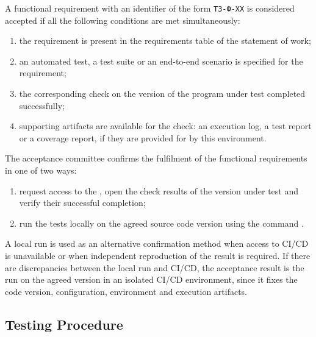 \documentclass[12pt,a4paper]{extarticle}
\begin{document}
\begin{hseExample}
A functional requirement with an identifier of the form \texttt{ТЗ-Ф-XX} is considered accepted if all the following conditions are met simultaneously:

\begin{enumerate}[label=\arabic*), leftmargin=1.25cm]
    \item the requirement is present in the requirements table of the statement of work;
    \item an automated test, a test suite or an end-to-end scenario is specified for the requirement;
    \item the corresponding check on the version of the program under test completed successfully;
    \item supporting artifacts are available for the check: an execution log, a test report or a coverage report, if they are provided for by this environment.
\end{enumerate}

The acceptance committee confirms the fulfilment of the functional requirements in one of two ways:

\begin{enumerate}[label=\arabic*), leftmargin=1.25cm]
    \item request access to the , open the check results of the version under test and verify their successful completion;
    \item run the tests locally on the agreed source code version using the command .
\end{enumerate}

A local run is used as an alternative confirmation method when access to CI/CD is unavailable or when independent reproduction of the result is required. If there are discrepancies between the local run and CI/CD, the acceptance result is the run on the agreed version in an isolated CI/CD environment, since it fixes the code version, configuration, environment and execution artifacts.
\end{hseExample}

\subsection{Testing Procedure}
\end{document}
